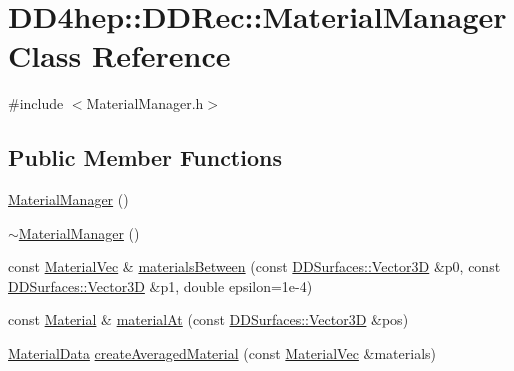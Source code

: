 \hypertarget{class_d_d4hep_1_1_d_d_rec_1_1_material_manager}{}\section{D\+D4hep\+:\+:D\+D\+Rec\+:\+:Material\+Manager Class Reference}
\label{class_d_d4hep_1_1_d_d_rec_1_1_material_manager}


{\ttfamily \#include $<$Material\+Manager.\+h$>$}

\subsection*{Public Member Functions}
\begin{DoxyCompactItemize}
\item 
\hyperlink{class_d_d4hep_1_1_d_d_rec_1_1_material_manager_a7f32a7b551449b6143f56ba4a3f90c18}{Material\+Manager} ()
\item 
\hyperlink{class_d_d4hep_1_1_d_d_rec_1_1_material_manager_a0251231cf063ba1b449c858b4b3a00a6}{$\sim$\+Material\+Manager} ()
\item 
const \hyperlink{namespace_d_d4hep_1_1_d_d_rec_a69fdab2f851316d2b9e50956920359f7}{Material\+Vec} \& \hyperlink{class_d_d4hep_1_1_d_d_rec_1_1_material_manager_a9e975753f152c9deb9c490e9222606c1}{materials\+Between} (const \hyperlink{class_d_d_surfaces_1_1_vector3_d}{D\+D\+Surfaces\+::\+Vector3D} \&p0, const \hyperlink{class_d_d_surfaces_1_1_vector3_d}{D\+D\+Surfaces\+::\+Vector3D} \&p1, double epsilon=1e-\/4)
\item 
const \hyperlink{class_d_d4hep_1_1_geometry_1_1_material}{Material} \& \hyperlink{class_d_d4hep_1_1_d_d_rec_1_1_material_manager_a230252814cc77e7d7e718783d376f41f}{material\+At} (const \hyperlink{class_d_d_surfaces_1_1_vector3_d}{D\+D\+Surfaces\+::\+Vector3D} \&pos)
\item 
\hyperlink{class_d_d4hep_1_1_d_d_rec_1_1_material_data}{Material\+Data} \hyperlink{class_d_d4hep_1_1_d_d_rec_1_1_material_manager_a44243f88b984a698c8b823885c439702}{create\+Averaged\+Material} (const \hyperlink{namespace_d_d4hep_1_1_d_d_rec_a69fdab2f851316d2b9e50956920359f7}{Material\+Vec} \&materials)
\end{DoxyCompactItemize}
